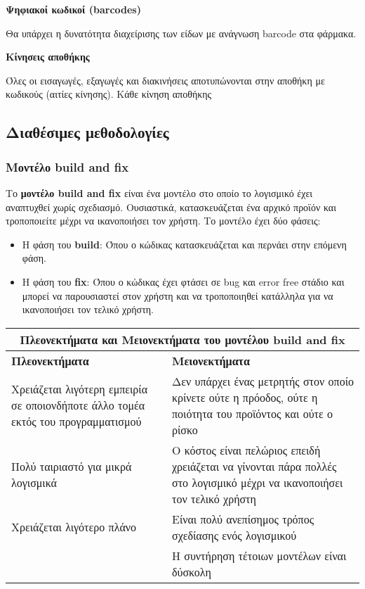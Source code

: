\begin{problem}
    \textbf{Ψηφιακοί κωδικοί (barcodes)}
\end{problem}

Θα υπάρχει η δυνατότητα διαχείρισης των είδων με ανάγνωση barcode στα φάρμακα.

\begin{problem}
    \textbf{Κίνησεις αποθήκης}
\end{problem}

Όλες οι εισαγωγές, εξαγωγές και διακινήσεις αποτυπώνονται στην αποθήκη με κωδικούς (αιτίες κίνησης).
Κάθε κίνηση αποθήκης

\subsection{Διαθέσιμες μεθοδολογίες}

\subsubsection{Μοντέλο build and fix}

Το \textbf{μοντέλο build and fix} είναι ένα μοντέλο στο οποίο το λογισμικό έχει 
αναπτυχθεί χωρίς σχεδιασμό. Ουσιαστικά, κατασκευάζεται ένα αρχικό προϊόν και τροποποιείτε
μέχρι να ικανοποιήσει τον χρήστη. Το μοντέλο έχει δύο φάσεις:

\begin{itemize}
    \item Η φάση του \textbf{build}: Όπου ο κώδικας κατασκευάζεται
    και περνάει στην επόμενη φάση.
    \item Η φάση του \textbf{fix}: Όπου ο κώδικας έχει φτάσει σε bug και 
    error free στάδιο και μπορεί να παρουσιαστεί στον χρήστη και να τροποποιηθεί 
    κατάλληλα για να ικανοποιήσει τον τελικό χρήστη. 
\end{itemize}

\begin{center}
    \begin{tabular}{| p{8cm} | p{8cm} |}
        \hline
        \multicolumn{2}{|c|}{\textbf{Πλεονεκτήματα και Μειονεκτήματα του μοντέλου build and fix}} \\
        \hline
        \textbf{Πλεονεκτήματα} & \textbf{Μειονεκτήματα} \\
        \hline
        Χρειάζεται λιγότερη εμπειρία σε οποιονδήποτε άλλο τομέα εκτός του προγραμματισμού & Δεν υπάρχει ένας μετρητής στον οποίο κρίνετε ούτε η πρόοδος, ούτε η ποιότητα του προϊόντος και ούτε ο ρίσκο \\
        \hline
        Πολύ ταιριαστό για μικρά λογισμικά &  Ο κόστος είναι πελώριος επειδή χρειάζεται να γίνονται πάρα πολλές στο λογισμικό μέχρι να ικανοποιήσει τον τελικό χρήστη \\
        \hline
        Χρειάζεται λιγότερο πλάνο & Είναι πολύ ανεπίσημος τρόπος σχεδίασης ενός λογισμικού \\
        \hline
        & Η συντήρηση τέτοιων μοντέλων είναι δύσκολη \\
        \hline
    \end{tabular}
\end{center}

